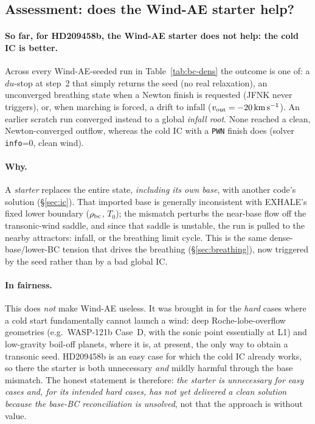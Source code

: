 \documentclass[english,a4paper]{my_memo}
\begin{document}
\subsection{Assessment: does the Wind-AE starter help?}
\label{sec:windae-assess}

\paragraph{So far, for HD209458b, the Wind-AE starter does not help: the cold
IC is better.} Across every Wind-AE-seeded run in Table~\ref{tab:bc-dens} the
outcome is one of: a $du$-stop at step~2 that simply returns the seed (no real
relaxation), an unconverged breathing state when a Newton finish is requested
(JFNK never triggers), or, when marching is forced, a drift to infall
($v_{\rm out} = -20\,\mathrm{km\,s^{-1}}$). An earlier scratch run converged
instead to a global \emph{infall root}. None reached a clean, Newton-converged
outflow, whereas the cold IC with a \texttt{PWN} finish does (solver
\texttt{info}=0, clean wind).

\paragraph{Why.} A \emph{starter} replaces the entire state, \emph{including its
own base}, with another code's solution (\S\ref{sec:ic}). That imported base is
generally inconsistent with EXHALE's fixed lower boundary ($\rho_{\rm bc}$,
$T_0$); the mismatch perturbs the near-base flow off the transonic-wind saddle,
and since that saddle is unstable, the run is pulled to the nearby attractors:
infall, or the breathing limit cycle. This is the same dense-base/lower-BC
tension that drives the breathing (\S\ref{sec:breathing}), now triggered by the
seed rather than by a bad global IC.

\paragraph{In fairness.} This does \emph{not} make Wind-AE useless. It was
brought in for the \emph{hard} cases where a cold start fundamentally cannot
launch a wind: deep Roche-lobe-overflow geometries (e.g.\ WASP-121b Case~D,
with the sonic point essentially at L1) and low-gravity boil-off planets,
where it is, at present, the only way to obtain a transonic seed. HD209458b is
an easy case for which the cold IC already works, so there the starter is both
unnecessary \emph{and} mildly harmful through the base mismatch. The honest
statement is therefore: \emph{the starter is unnecessary for easy cases and,
for its intended hard cases, has not yet delivered a clean solution because the
base-BC reconciliation is unsolved}, not that the approach is without value.
\end{document}
